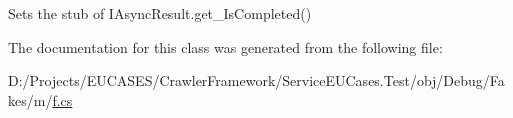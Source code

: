 Sets the stub of I\-Async\-Result.\-get\-\_\-\-Is\-Completed()



The documentation for this class was generated from the following file\-:\begin{DoxyCompactItemize}
\item 
D\-:/\-Projects/\-E\-U\-C\-A\-S\-E\-S/\-Crawler\-Framework/\-Service\-E\-U\-Cases.\-Test/obj/\-Debug/\-Fakes/m/\hyperlink{m_2f_8cs}{f.\-cs}\end{DoxyCompactItemize}

